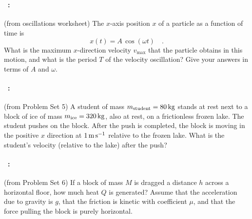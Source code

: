\documentclass[12pt]{article}
\begin{document}
\vfill
~
\clearpage
\paragraph{\problemname~\theproblem:}%
(from oscillations worksheet)
The $x$-axis position $x$ of a particle as a function of time is
$$
x(t) = A\,\cos(\omega t) \quad .
$$
What is the maximum $x$-direction velocity $v_{\mathrm{max}}$ that the
particle obtains in this motion, and what is the period $T$ of the
velocity oscillation?  Give your answers in terms of $A$ and $\omega$.

\vfill

\paragraph{\problemname~\theproblem:}%
(from Problem Set 5)
A student of mass $m_\mathrm{student}=80\,\mathrm{kg}$ stands at rest next to
a block of ice of mass $m_\mathrm{ice}=320\,\mathrm{kg}$, also at rest, on a
frictionless frozen lake.  The student pushes on the block. After the
push is completed, the block is moving in the positive $x$ direction at $1\,\mathrm{m}\,\mathrm{s}^{-1}$
relative to the frozen lake.
What is the student's velocity (relative to the lake) after the push?


\vfill

\paragraph{\problemname~\theproblem:}%
(from Problem Set 6)
If a block of mass $M$ is dragged a distance $h$ across a horizontal floor,
how much heat $Q$ is generated? Assume that the acceleration due to
gravity is $g$, that the friction is kinetic with
coefficient $\mu$, and that the force pulling the block is purely
horizontal.

\vfill
~
\end{document}
